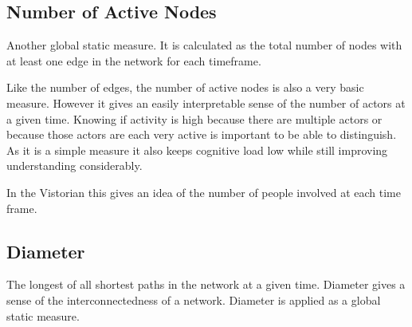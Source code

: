 \subsection{Number of Active Nodes}
Another global static measure. It is calculated as the total number of nodes with at least one edge in the network for each timeframe.

Like the number of edges, the number of active nodes is also a very basic measure. However it gives an easily interpretable sense of the number of actors at a given time. Knowing if activity is high because there are multiple actors or because those actors are each very active is important to be able to distinguish. As it is a simple measure it also keeps cognitive load low while still improving understanding considerably.

In the Vistorian this gives an idea of the number of people involved at each time frame. 


\subsection{Diameter}
The longest of all shortest paths in the network at a given time. Diameter gives a sense of the interconnectedness of a network. Diameter is applied as a global static measure.

